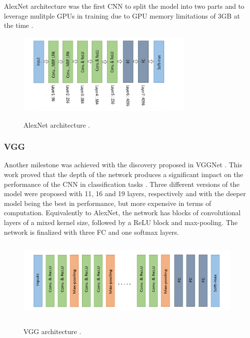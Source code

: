 \documentclass[english, 12pt, a4paper, elec, utf8, a-1b, online]{aaltothesis}
\begin{document}
AlexNet architecture was the first CNN to split the model into two parts and to leverage mulitple GPUs in training due to GPU memory limitations of 3GB at the time \cite{NIPS2012_c399862d}. 

\begin{figure}[htb]
	\begin{center}
		\includegraphics[height=4cm]{./AlexNet.png}
	\end{center}
	\caption{AlexNet architecture \cite{alom01}.}
	\begin{center}
		\label{AlexNet}
	\end{center}
\end{figure}
\FloatBarrier

\subsubsection{VGG}
Another milestone was achieved with the discovery proposed in VGGNet \cite{Simonyan2014}. This work proved that the depth of the network produces a significant impact on the performance of the CNN in classification tasks \cite{alom01}. Three different versions of the model were proposed with 11, 16 and 19 layers, respectively and with the deeper model being the best in performance, but more expensive in terms of computation. Equivalently to AlexNet, the network has blocks of convolutional layers of a mixed kernel size, followed by a ReLU block and max-pooling. The network is finalized with three FC and one softmax layers. 

\begin{figure}[htb]
	\begin{center}
		\includegraphics[height=4cm]{./vgg.png}
	\end{center}
	\caption{VGG architecture \cite{alom01}.}
	\begin{center}
		\label{VGG}
	\end{center}
\end{figure}
\FloatBarrier
\end{document}
